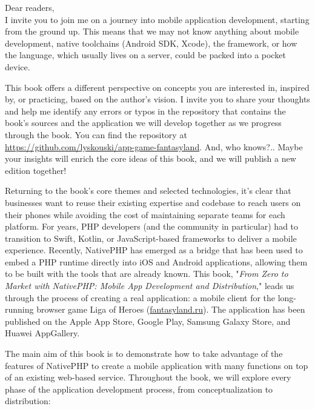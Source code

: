 
Dear readers, \\
I invite you to join me on a journey into mobile application development, starting from the
ground up. This means that we may not know anything about mobile development, native toolchains
(Android SDK, Xcode), the  framework, or how the  language, which usually
lives on a server, could be packed into a pocket device.

This book offers a different perspective on concepts you are interested in, inspired by, or
practicing, based on the author's vision. I invite you to share your thoughts and help me
identify any errors or typos in the repository that contains the book's sources and the
application we will develop together as we progress through the book. You can find the
repository at \href{https://github.com/lyskouski/app-game-fantasyland}{https://github.com/lyskouski/app-game-fantasyland}.
And, who knows?.. Maybe your insights will enrich the core ideas of this book, and we will
publish a new edition together!

Returning to the book's core themes and selected technologies, it's clear that businesses want
to reuse their existing expertise and codebase to reach users on their phones while avoiding the
cost of maintaining separate teams for each platform. For years, PHP developers (and the
 community in particular) had to transition to Swift, Kotlin, or JavaScript-based
frameworks to deliver a mobile experience. Recently, NativePHP has emerged as a bridge that
has been used to embed a PHP runtime directly into iOS and Android applications, allowing them
to be built with the tools that are already known. This book, "\emph{From Zero to Market with
NativePHP: Mobile App Development and Distribution}," leads us through the process of creating a
real application: a mobile client for the long-running browser game Liga of Heroes
(\href{https://fantasyland.ru}{fantasyland.ru}). The application has been published on the Apple
App Store, Google Play, Samsung Galaxy Store, and Huawei AppGallery.

The main aim of this book is to demonstrate how to take advantage of the features of NativePHP
to create a mobile application with many functions on top of an existing web-based service.
Throughout the book, we will explore every phase of the application development process, from
conceptualization to distribution:


